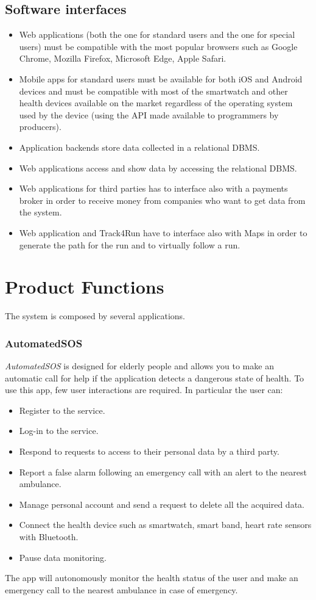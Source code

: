 \subsection{Software interfaces}
\begin{itemize}
\item Web applications (both the one for standard users and the one for special users) must be compatible with the most popular browsers such as Google Chrome, Mozilla Firefox, Microsoft Edge, Apple Safari.
\item	Mobile apps for standard users must be available for both iOS and Android devices and must be compatible with most of the smartwatch and other health devices available on the market regardless of the operating system used by the device (using the API made available to programmers by producers).
\item	Application backends store data collected in a relational DBMS.
\item	 Web applications access and show data by accessing the relational DBMS.
\item	 Web applications for third parties has to interface also with a payments broker in order to receive money from companies who want to get data from the system.
\item Web application and Track4Run have to interface also with Maps in order to generate the path for the run and to virtually follow a run.
\end{itemize}

\section{Product Functions}
The system is composed by several applications.
\subsubsection{AutomatedSOS}
\textit{AutomatedSOS} is designed for elderly people and allows you to make an automatic call for help if the application detects a dangerous state of health.
To use this app, few user interactions are required.
In particular the user can:
\begin{itemize}
\item Register to the service.
\item Log-in to the service.
\item Respond to requests to access to their personal data by a third party.
\item Report a false alarm following an emergency call with an alert to the nearest ambulance.
\item Manage personal account and send a request to delete all the acquired data.
\item Connect the health device such as smartwatch, smart band, heart rate sensors with Bluetooth.
\item Pause data monitoring.
\end{itemize}
The app will autonomously monitor the health status of the user and make an emergency call to the nearest ambulance in case of emergency.

